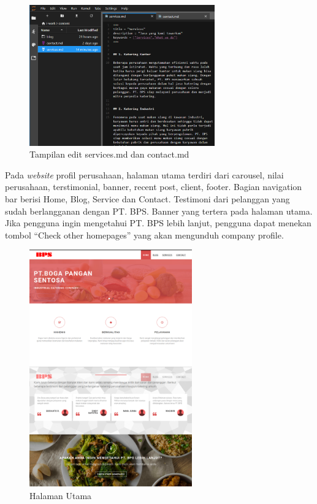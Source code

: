\begin{figure}[htbp]
    \begin{center}
    \includegraphics[width=8cm]{img/scr-adm-4.png}
    \caption{Tampilan edit services.md dan contact.md}
    \label{gambar:scr-adm-4}
    \end{center}
\end{figure}


Pada \emph{website} profil perusahaan, halaman utama terdiri dari carousel, nilai perusahaan, 
terstimonial, banner, recent post, client, footer. Bagian navigation bar berisi Home, 
Blog, Service dan Contact. Testimoni dari pelanggan yang sudah berlangganan dengan 
PT. BPS. Banner yang tertera pada halaman utama. Jika pengguna ingin mengetahui 
PT. BPS lebih lanjut, pengguna dapat menekan tombol 
“Check other homepages” yang akan mengunduh company profile. 


%
%

\begin{figure}[htbp]
    \begin{center}
    \includegraphics[width=7cm]{img/scr-website-1.png}
    \caption{Halaman Utama}
    \label{gambar:scr-website-1}
    \end{center}
\end{figure}

